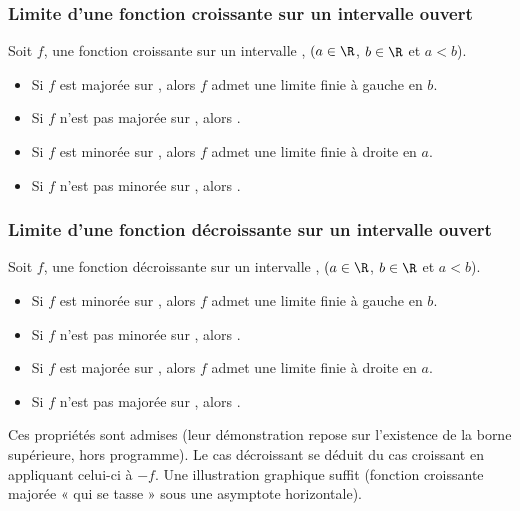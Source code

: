 \subsubsection{Limite d'une fonction croissante sur un intervalle ouvert}
\begin{propriete}
	Soit $f$, une fonction croissante sur un intervalle , $(a\in \R$, $b\in \R$ et $a<b$).
	\begin{itemize}
		\item[$\bullet$] Si $f$ est majorée sur , alors $f$ admet une limite finie à gauche en $b$.
		\item[$\bullet$] Si $f$ n'est pas majorée sur , alors .
		\item[$\bullet$] Si $f$ est minorée sur , alors $f$ admet une limite finie à droite en $a$.
		\item[$\bullet$] Si $f$ n'est pas minorée sur , alors .
	\end{itemize}
\end{propriete}
\subsubsection{Limite d'une fonction décroissante sur un intervalle ouvert}\vspace*{-0.3cm}
\begin{propriete}
	Soit $f$, une fonction décroissante sur un intervalle , $(a\in \R$, $b\in \R$ et $a<b$).
	\begin{itemize}
		\item[$\bullet$] Si $f$ est minorée sur , alors $f$ admet une limite finie à gauche en $b$.
		\item[$\bullet$] Si $f$ n'est pas minorée sur , alors .
		\item[$\bullet$] Si $f$ est majorée sur , alors $f$ admet une limite finie à droite en $a$.
		\item[$\bullet$] Si $f$ n'est pas majorée sur , alors .
	\end{itemize}
\end{propriete}
\begin{noteprof}
Ces propriétés sont admises (leur démonstration repose sur l'existence de la borne supérieure, hors programme). Le cas décroissant se déduit du cas croissant en appliquant celui-ci à $-f$. Une illustration graphique suffit (fonction croissante majorée « qui se tasse » sous une asymptote horizontale).
\end{noteprof}

